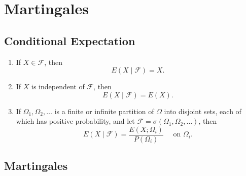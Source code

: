 \chapter{Martingales}

\section{Conditional Expectation}

\begin{definition}

\end{definition}

\begin{example}
	\begin{enumerate}
		\item If $X\in\mathcal{F}$, then
		      \begin{equation*}
			      E\left(X\mid\mathcal{F}\right)=X.
		      \end{equation*}
		\item If $X$ is independent of $\mathcal{F}$, then
		      \begin{equation*}
			      E\left(X\mid\mathcal{F}\right)=E(X).
		      \end{equation*}
		\item If $\Omega_{1}, \Omega_{2}, \ldots$ is a finite or infinite partition of $\Omega$ into disjoint sets, each of which has positive probability, and let $\mathcal{F}=\sigma\left(\Omega_{1},\Omega_{2},\ldots\right)$, then
		      \begin{equation*}
			      E\left(X\mid\mathcal{F}\right)=\frac{E\left(X;\Omega_{i}\right)}{P\left(\Omega_{i}\right)}\quad\text { on }\Omega_{i}.
		      \end{equation*}
	\end{enumerate}
\end{example}

\begin{property}

\end{property}

\section{Martingales}

